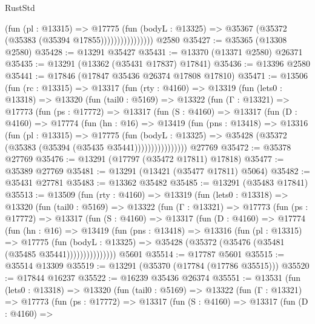 \begin{lexlean}{RustStd}
\begin{coremodule}
                          (fun (pl : @13315) =>
                          @17775
                            (fun (bodyL : @13325) =>
                            @35367 (@35372 (@35383 (@35394 @17855))))))))))))))))
    @2580
@35427 := @35365 (@13308 @2580)
@35428 := @13291 @35427
@35431 := @13370 (@13371 @2580) @26371
@35435 := @13291 (@13362 (@35431 @17837) @17841)
@35436 := @13396 @2580
@35441 := @17846 (@17847 @35436 @26374 @17808 @17810)
@35471 := @13506
    (fun (rc : @13315) =>
    @13317
      (fun (rty : @4160) =>
      @13319
        (fun (lets0 : @13318) =>
        @13320
          (fun (tail0 : @5169) =>
          @13322
            (fun (Γ : @13321) =>
            @17773
              (fun (ps : @17772) =>
              @13317
                (fun (S : @4160) =>
                @13317
                  (fun (D : @4160) =>
                  @17774
                    (fun (hn : @16) =>
                    @13419
                      (fun (pns : @13418) =>
                      @13316
                        (fun (pl : @13315) =>
                        @17775
                          (fun (bodyL : @13325) =>
                          @35428 (@35372 (@35383 (@35394 (@35435 @35441))))))))))))))))
    @27769
@35472 := @35378 @27769
@35476 := @13291 (@17797 (@35472 @17811) @17818)
@35477 := @35389 @27769
@35481 := @13291 (@13421 (@35477 @17811) @5064)
@35482 := @35431 @27781
@35483 := @13362 @35482
@35485 := @13291 (@35483 @17841)
@35513 := @13509
    (fun (rty : @4160) =>
    @13319
      (fun (lets0 : @13318) =>
      @13320
        (fun (tail0 : @5169) =>
        @13322
          (fun (Γ : @13321) =>
          @17773
            (fun (ps : @17772) =>
            @13317
              (fun (S : @4160) =>
              @13317
                (fun (D : @4160) =>
                @17774
                  (fun (hn : @16) =>
                  @13419
                    (fun (pns : @13418) =>
                    @13316
                      (fun (pl : @13315) =>
                      @17775
                        (fun (bodyL : @13325) =>
                        @35428 (@35372 (@35476 (@35481 (@35485 @35441)))))))))))))))
    @5601
@35514 := @17787 @5601
@35515 := @35514 @13309
@35519 := @13291 (@35370 (@17784 (@17786 @35515)))
@35520 := @17844 @16237
@35522 := @16239 @35436 @26374
@35551 := @13531
    (fun (lets0 : @13318) =>
    @13320
      (fun (tail0 : @5169) =>
      @13322
        (fun (Γ : @13321) =>
        @17773
          (fun (ps : @17772) =>
          @13317
            (fun (S : @4160) =>
            @13317
              (fun (D : @4160) =>

\end{coremodule}
\end{lexlean}
